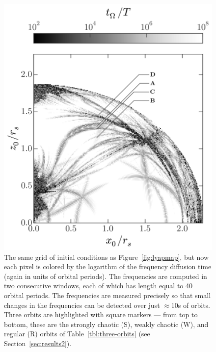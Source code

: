 \documentclass[letterpaper,12pt,preprint]{aastex}
\begin{document}
\begin{figure}[p]
\begin{center}
\includegraphics[width=\textwidth, trim={0 1cm 0 0}]{figures/fdiff_map.png}
\caption{The same grid of initial conditions as Figure~\ref{fig:lyapmap}, but now each pixel is colored by the logarithm of the frequency diffusion time (again in units of orbital periods). The frequencies are computed in two consecutive windows, each of which has length equal to 40 orbital periods. The frequencies are measured precisely so that small changes in the frequencies can be detected over just $\approx$10s of orbits. Three orbits are highlighted with square markers --- from top to bottom, these are the strongly chaotic (S), weakly chaotic (W), and regular (R) orbits of Table~\ref{tbl:three-orbits} (see Section~\ref{sec:results2}).} \label{fig:freqdiff}
\end{center}
\end{figure}
\end{document}
